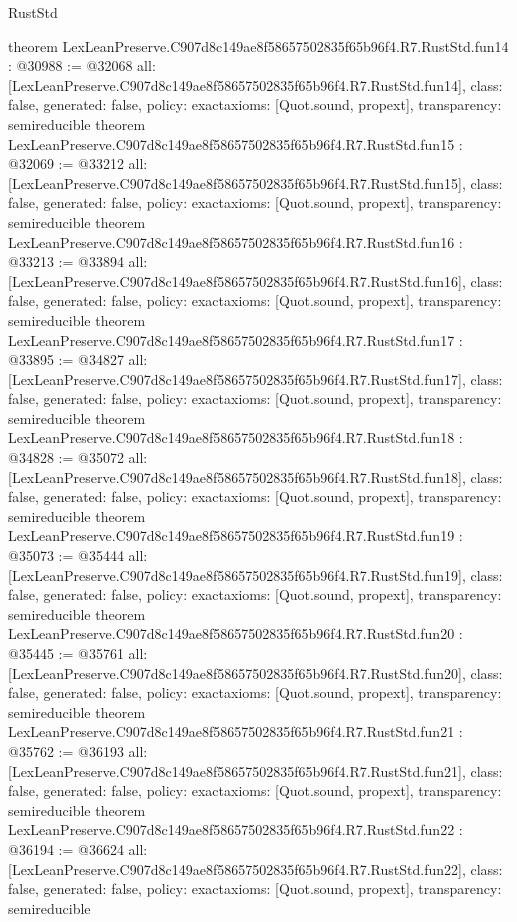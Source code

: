 \begin{lexlean}{RustStd}
\begin{coremodule}
{}
theorem LexLeanPreserve.C907d8c149ae8f58657502835f65b96f4.R7.RustStd.fun14 : @30988 := @32068 {
  all: [LexLeanPreserve.C907d8c149ae8f58657502835f65b96f4.R7.RustStd.fun14],
  class: false,
  generated: false,
  policy: exact{axioms: [Quot.sound, propext]},
  transparency: semireducible
}
theorem LexLeanPreserve.C907d8c149ae8f58657502835f65b96f4.R7.RustStd.fun15 : @32069 := @33212 {
  all: [LexLeanPreserve.C907d8c149ae8f58657502835f65b96f4.R7.RustStd.fun15],
  class: false,
  generated: false,
  policy: exact{axioms: [Quot.sound, propext]},
  transparency: semireducible
}
theorem LexLeanPreserve.C907d8c149ae8f58657502835f65b96f4.R7.RustStd.fun16 : @33213 := @33894 {
  all: [LexLeanPreserve.C907d8c149ae8f58657502835f65b96f4.R7.RustStd.fun16],
  class: false,
  generated: false,
  policy: exact{axioms: [Quot.sound, propext]},
  transparency: semireducible
}
theorem LexLeanPreserve.C907d8c149ae8f58657502835f65b96f4.R7.RustStd.fun17 : @33895 := @34827 {
  all: [LexLeanPreserve.C907d8c149ae8f58657502835f65b96f4.R7.RustStd.fun17],
  class: false,
  generated: false,
  policy: exact{axioms: [Quot.sound, propext]},
  transparency: semireducible
}
theorem LexLeanPreserve.C907d8c149ae8f58657502835f65b96f4.R7.RustStd.fun18 : @34828 := @35072 {
  all: [LexLeanPreserve.C907d8c149ae8f58657502835f65b96f4.R7.RustStd.fun18],
  class: false,
  generated: false,
  policy: exact{axioms: [Quot.sound, propext]},
  transparency: semireducible
}
theorem LexLeanPreserve.C907d8c149ae8f58657502835f65b96f4.R7.RustStd.fun19 : @35073 := @35444 {
  all: [LexLeanPreserve.C907d8c149ae8f58657502835f65b96f4.R7.RustStd.fun19],
  class: false,
  generated: false,
  policy: exact{axioms: [Quot.sound, propext]},
  transparency: semireducible
}
theorem LexLeanPreserve.C907d8c149ae8f58657502835f65b96f4.R7.RustStd.fun20 : @35445 := @35761 {
  all: [LexLeanPreserve.C907d8c149ae8f58657502835f65b96f4.R7.RustStd.fun20],
  class: false,
  generated: false,
  policy: exact{axioms: [Quot.sound, propext]},
  transparency: semireducible
}
theorem LexLeanPreserve.C907d8c149ae8f58657502835f65b96f4.R7.RustStd.fun21 : @35762 := @36193 {
  all: [LexLeanPreserve.C907d8c149ae8f58657502835f65b96f4.R7.RustStd.fun21],
  class: false,
  generated: false,
  policy: exact{axioms: [Quot.sound, propext]},
  transparency: semireducible
}
theorem LexLeanPreserve.C907d8c149ae8f58657502835f65b96f4.R7.RustStd.fun22 : @36194 := @36624 {
  all: [LexLeanPreserve.C907d8c149ae8f58657502835f65b96f4.R7.RustStd.fun22],
  class: false,
  generated: false,
  policy: exact{axioms: [Quot.sound, propext]},
  transparency: semireducible
}
\end{coremodule}
\end{lexlean}
